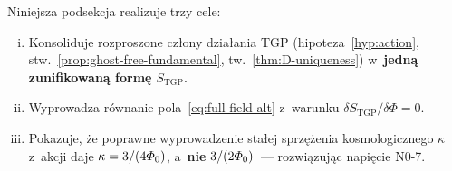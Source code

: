 %
%
%
%
%

Niniejsza podsekcja realizuje trzy cele:
\begin{enumerate}[(i)]
  \item Konsoliduje rozproszone cz\l{}ony dzia\l{}ania TGP
    (hipoteza~\ref{hyp:action}, stw.~\ref{prop:ghost-free-fundamental},
    tw.~\ref{thm:D-uniqueness}) w~\textbf{jedn\k{a} zunifikowan\k{a}
    form\k{e}} $S_{\mathrm{TGP}}$.
  \item Wyprowadza r\'ownanie pola~\eqref{eq:full-field-alt}
    z~warunku $\delta S_{\mathrm{TGP}}/\delta\Phi = 0$.
  \item Pokazuje, \.ze poprawne wyprowadzenie sta\l{}ej sprz\k{e}\.zenia
    kosmologicznego $\kappa$ z~akcji daje
    $\kappa = 3/(4\varPhi_0)$, a~\textbf{nie} $3/(2\varPhi_0)$~---
    rozwi\k{a}zuj\k{a}c napi\k{e}cie N0-7.
\end{enumerate}

